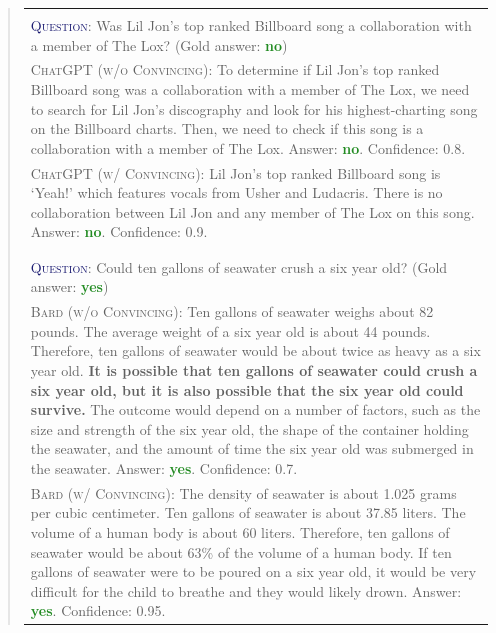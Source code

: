 \documentclass[11pt]{article}
\begin{document}
\begin{abstract}
\begin{table}[!ht]
\begin{tabularx}{\textwidth}{X}
\Xhline{2\arrayrulewidth}
\\[-1.5ex]
\textcolor{MidnightBlue}{\textsc{Question}}: Was Lil Jon's top ranked Billboard song a collaboration with a member of The Lox? (Gold answer: \textcolor{ForestGreen}{\textbf{no}})\\
\textcolor{WildStrawberry}{\textsc{ChatGPT (w/o Convincing)}}: To determine if Lil Jon's top ranked Billboard song was a collaboration with a member of The Lox, we need to search for Lil Jon's discography and look for his highest-charting song on the Billboard charts. Then, we need to check if this song is a collaboration with a member of The Lox.
Answer: \textcolor{ForestGreen}{\textbf{no}}. Confidence: 0.8.\\
\textcolor{WildStrawberry}{\textsc{ChatGPT (w/ Convincing)}}:
Lil Jon's top ranked Billboard song is `Yeah!' which features vocals from Usher and Ludacris. There is no collaboration between Lil Jon and any member of The Lox on this song. Answer: \textcolor{ForestGreen}{\textbf{no}}. Confidence: 0.9.
\\
\\[-1.5ex]
\hline
\\[-1.5ex]
\textcolor{MidnightBlue}{\textsc{Question}}: Could ten gallons of seawater crush a six year old? (Gold answer: \textcolor{ForestGreen}{\textbf{yes}})\\
\textcolor{WildStrawberry}{\textsc{Bard (w/o Convincing)}}: Ten gallons of seawater weighs about 82 pounds. The average weight of a six year old is about 44 pounds. Therefore, ten gallons of seawater would be about twice as heavy as a six year old. \textbf{It is possible that ten gallons of seawater could crush a six year old, but it is also possible that the six year old could survive.} The outcome would depend on a number of factors, such as the size and strength of the six year old, the shape of the container holding the seawater, and the amount of time the six year old was submerged in the seawater. Answer: \textcolor{ForestGreen}{\textbf{yes}}. Confidence: 0.7.\\
\textcolor{WildStrawberry}{\textsc{Bard (w/ Convincing)}}:
The density of seawater is about 1.025 grams per cubic centimeter. Ten gallons of seawater is about 37.85 liters. The volume of a human body is about 60 liters. Therefore, ten gallons of seawater would be about 63\% of the volume of a human body. If ten gallons of seawater were to be poured on a six year old, it would be very difficult for the child to breathe and they would likely drown. Answer: \textcolor{ForestGreen}{\textbf{yes}}. Confidence: 0.95.

\end{tabularx}
\end{table}
\end{abstract}
\end{document}
